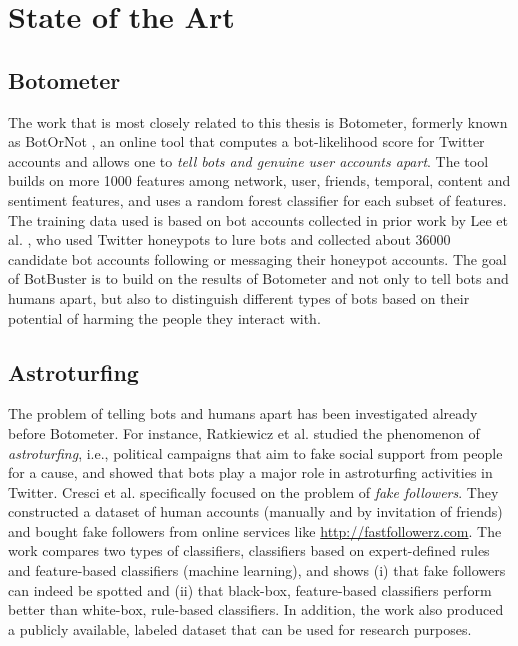 \chapter{State of the Art}
\label{capitolo2}
\thispagestyle{empty}

\section{Botometer}
The work that is most closely related to this thesis is Botometer, formerly known as BotOrNot \cite{davis2016botornot,ferrara2016rise}, an online tool that computes a bot-likelihood score for 
Twitter accounts and allows one to \emph{tell bots and genuine user accounts apart}. The tool builds on more 1000 features among network, user, friends, temporal, content and sentiment features, and uses a random forest classifier for each subset of features. The training data used is based on bot accounts collected in prior work by Lee et al. \cite{lee2011seven}, who used Twitter honeypots to lure bots and collected about
36000 candidate bot accounts following or messaging their honeypot accounts. The goal of BotBuster is to build on the results of Botometer and not only to tell bots and humans apart, but also to distinguish different types of bots based on their potential of harming the people they 
interact with.

\section{Astroturfing}
The problem of telling bots and humans apart has been investigated already before Botometer. For instance, Ratkiewicz et al. \cite{ratkiewicz2011detecting} studied the phenomenon of \emph{astroturfing}, i.e., political campaigns that aim to fake social support from people for a cause, and showed that bots play a major role in astroturfing activities in Twitter. Cresci et al. \cite{cresci2015fame} specifically
focused on the problem of \emph{fake followers}. They constructed a dataset of human accounts (manually and by invitation of friends) and bought fake followers from online services like \url{http://fastfollowerz.com}. The work compares two types of classifiers, classifiers based on expert-defined rules and feature-based classifiers (machine learning), and shows (i) that fake followers 
can indeed be spotted and (ii) that black-box, feature-based classifiers perform better than white-box, rule-based classifiers. In addition, the work also produced a publicly available, labeled dataset that can be used for research purposes.

